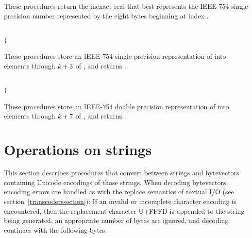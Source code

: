 \begin{entry}{%
}


These procedures return the inexact real that best represents the IEEE-754 single
precision number represented by the eight bytes beginning at index
.
\end{entry}

\begin{entry}{%
}
{\tt\obeyspaces\\
       )}


These procedures store an IEEE-754 single precision representation of  into
elements  through $\textnormal{\textit{k}}+3$ of , and returns
\unspecifiedreturn.
\end{entry}

\begin{entry}{%
}
{\tt\obeyspaces\\
       )}


These procedures store an IEEE-754 double precision representation of  into
elements  through $\textnormal{\textit{k}}+7$ of , and returns
\unspecifiedreturn.
\end{entry}

\section{Operations on strings}

This section describes procedures that convert between strings and
bytevectors containing Unicode encodings of those strings.  When
decoding bytevectors, encoding errors are handled as with the {\cf
  replace} semantics of textual I/O (see
section~\ref{transcoderssection}): If an invalid or incomplete
character encoding is encountered, then the replacement character
U+FFFD is appended to the string being generated, an appropriate
number of bytes are ignored, and decoding continues with the following
bytes.

